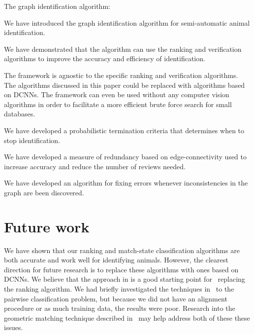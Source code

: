 \begin{enumln}

    \item {The graph identification algorithm}:
        \begin{enumln}
        \item We have introduced the graph identification algorithm for semi-automatic animal identification.

        \item We have demonstrated that the algorithm can use the ranking and verification algorithms to improve
          the accuracy and efficiency of identification.

        \item The framework is agnostic to the specific ranking and verification algorithms.
        The algorithms discussed in this paper could be replaced with algorithms based on DCNNs.
        The framework can even be used without any computer vision algorithms in order to facilitate a more
          efficient brute force search for small databases.

        \item We have developed a probabilistic termination criteria that determines when to stop identification.

        \item We have developed a measure of redundancy based on edge-connectivity used to increase accuracy and
          reduce the number of reviews needed.

        \item We have developed an algorithm for fixing errors whenever inconsistencies in the graph are been
          discovered.
        \end{enumln}
    \end{enumln}

    \section{Future work}\label{sec:futurework}

    We have shown that our ranking and match-state classification algorithms are both accurate and work well for
      identifying animals.
    However, the clearest direction for future research is to replace these algorithms with ones based on DCNNs.
    We believe that the approach in is a good starting point for~\cite{arandjelovic_netvlad_2016} replacing the
      ranking algorithm.
    We had briefly investigated the techniques in~\cite{taigman_deepface_2014} to the pairwise classification
      problem, but because we did not have an alignment procedure or as much training data, the results were poor.
    Research into the geometric matching technique described in~\cite{rocco_convolutional_2017} may help address
      both of these these issues.

